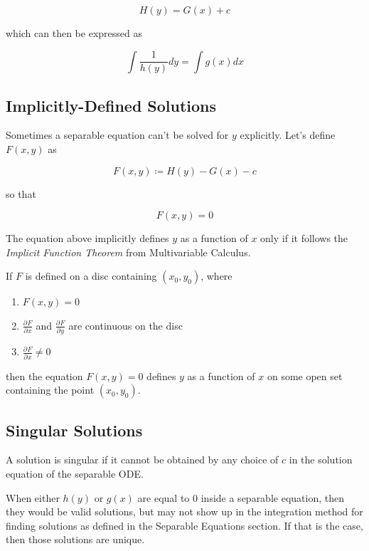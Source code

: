 \[
    H(y) = G(x) + c
\]

which can then be expressed as

\[
    \int \frac{1}{h(y)} dy = \int g(x) dx
\]

\subsection{Implicitly-Defined Solutions}

Sometimes a separable equation can't be solved for $y$ explicitly. Let's define $F(x,y)$ as

\[
    F(x,y) \coloneq H(y) - G(x) - c
\]

so that

\[
    F(x,y) = 0
\]

The equation above implicitly defines $y$ as a function of $x$ only if it follows the \textit{Implicit Function Theorem} from Multivariable Calculus.

\begin{theorem}
    If $F$ is defined on a disc containing $(x_0, y_0)$, where

    \begin{enumerate}
        \item $F(x,y) = 0$
        \item $\frac{\partial^{}F}{\partial^{}x}$ and $\frac{\partial^{}F}{\partial^{}y}$ are continuous on the disc
        \item $\frac{\partial^{}F}{\partial^{}x} \ne 0$
    \end{enumerate}

    then the equation $F(x,y) = 0$ defines $y$ as a function of $x$ on some open set containing the point $(x_0, y_0)$.
\end{theorem}

\subsection{Singular Solutions}

\begin{definition}
    A solution is singular if it cannot be obtained by any choice of $c$ in the solution equation of the separable ODE.
\end{definition}

When either $h(y)$ or $g(x)$ are equal to $0$ inside a separable equation, then they would be valid solutions, but may not show up in the integration method for finding solutions as defined in the Separable Equations section. If that is the case, then those solutions are unique.

